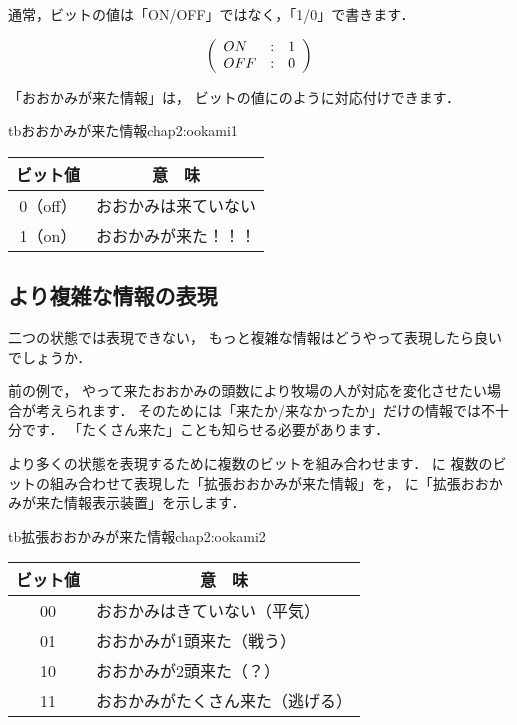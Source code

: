 通常，ビットの値は「ON/OFF」ではなく，「1/0」で書きます．

{\small\[\left(\begin{array}{l c l}
ON  & : & 1 \\
OFF & : & 0
\end{array}\right)\]}

「おおかみが来た情報」は，
ビットの値にのように対応付けできます．

\begin{mytable}{tb}{おおかみが来た情報}{chap2:ookami1}
{\small\begin{tabular}{c|l} \hline\hline
ビット値 & \multicolumn{1}{c}{意　味} \\
\hline
0（off） & おおかみは来ていない \\
1（on）  & おおかみが来た！！！ \\
\end{tabular}}
\end{mytable}

\subsection{より複雑な情報の表現}

二つの状態では表現できない，
もっと複雑な情報はどうやって表現したら良いでしょうか．

前の例で，
やって来たおおかみの頭数により牧場の人が対応を変化させたい場合が考えられます．
そのためには「来たか/来なかったか」だけの情報では不十分です．
「たくさん来た」ことも知らせる必要があります．

より多くの状態を表現するために複数のビットを組み合わせます．
に
複数のビットの組み合わせて表現した「拡張おおかみが来た情報」を，
に「拡張おおかみが来た情報表示装置」を示します．

\begin{mytable}{tb}{拡張おおかみが来た情報}{chap2:ookami2}
{\small\begin{tabular}{c|l} \hline\hline
ビット値 & \multicolumn{1}{c}{意　味}  \\
\hline
00 & おおかみはきていない（平気）      \\
01 & おおかみが1頭来た（戦う）         \\
10 & おおかみが2頭来た（？）           \\
11 & おおかみがたくさん来た（逃げる）  \\
\end{tabular}}
\end{mytable}

